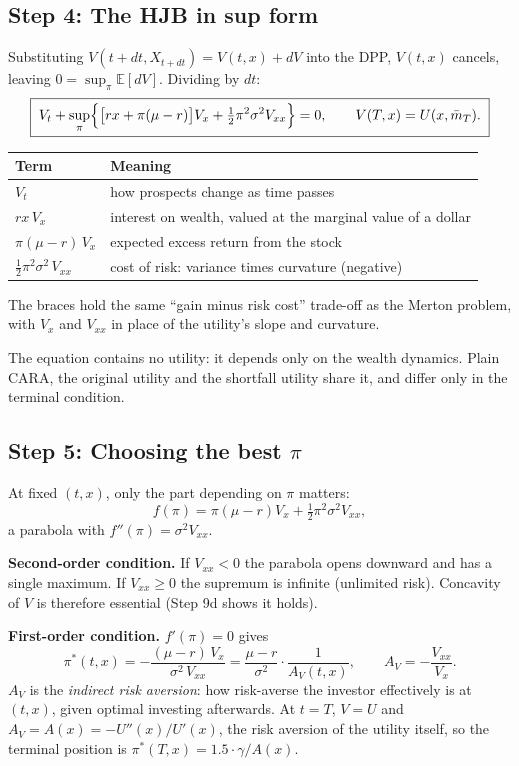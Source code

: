 \documentclass[11pt]{article}
\newcommand{\E}{\mathbb{E}}
\newcommand{\mb}{\bar m}
\begin{document}
\subsection*{Step 4: The HJB in sup form}
Substituting $V(t+dt,X_{t+dt})=V(t,x)+dV$ into the DPP, $V(t,x)$ cancels, leaving
$0=\sup_\pi\E[dV]$. Dividing by $dt$:
\[
  \boxed{\;V_t + \sup_{\pi}\Bigl\{\bigl[rx+\pi(\mu-r)\bigr]V_x + \tfrac12\pi^2\sigma^2V_{xx}\Bigr\} = 0,
  \qquad V(T,x)=U(x,\mb_T).\;}
\]
\begin{center}
\begin{tabular}{@{}ll@{}}
\toprule
Term & Meaning \\
\midrule
$V_t$ & how prospects change as time passes \\
$rx\,V_x$ & interest on wealth, valued at the marginal value of a dollar \\
$\pi(\mu-r)\,V_x$ & expected excess return from the stock \\
$\tfrac12\pi^2\sigma^2\,V_{xx}$ & cost of risk: variance times curvature (negative) \\
\bottomrule
\end{tabular}
\end{center}
The braces hold the same ``gain minus risk cost'' trade-off as the Merton problem,
with $V_x$ and $V_{xx}$ in place of the utility's slope and curvature.

The equation contains no utility: it depends only on the wealth dynamics. Plain
CARA, the original utility and the shortfall utility share it, and differ only in the
terminal condition.

\subsection*{Step 5: Choosing the best \texorpdfstring{$\pi$}{pi}}
At fixed $(t,x)$, only the part depending on $\pi$ matters:
\[
  f(\pi) = \pi(\mu-r)V_x + \tfrac12\pi^2\sigma^2V_{xx},
\]
a parabola with $f''(\pi)=\sigma^2V_{xx}$.

\textbf{Second-order condition.} If $V_{xx}<0$ the parabola opens downward and has a single
maximum. If $V_{xx}\ge0$ the supremum is infinite (unlimited risk). Concavity of $V$ is
therefore essential (Step 9d shows it holds).

\textbf{First-order condition.} $f'(\pi)=0$ gives
\[
  \boxed{\;\pi^*(t,x) = -\frac{(\mu-r)\,V_x}{\sigma^2\,V_{xx}}
          = \frac{\mu-r}{\sigma^2}\cdot\frac{1}{A_V(t,x)},
  \qquad A_V = -\frac{V_{xx}}{V_x}.\;}
\]
$A_V$ is the \emph{indirect risk aversion}: how risk-averse the investor effectively is at
$(t,x)$, given optimal investing afterwards. At $t=T$, $V=U$ and $A_V=A(x)=-U''(x)/U'(x)$, the
risk aversion of the utility itself, so the terminal position is
$\pi^*(T,x)=1.5\cdot\gamma/A(x)$.
\end{document}
